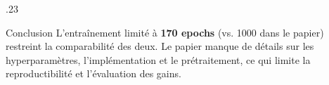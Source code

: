 \documentclass{beamer}
\begin{document}
\begin{frame}
\begin{columns}[T]
\begin{column}{.23\textwidth}
\begin{block}{Conclusion}
L’entraînement limité à \textbf{170 epochs} (vs. 1000 dans le papier)
restreint la comparabilité des deux.
Le papier manque de détails sur les hyperparamètres, l’implémentation
et le prétraitement, ce qui limite la reproductibilité et l’évaluation des gains.
\end{block}





\end{column}


\end{columns}

\end{frame}
\end{document}
